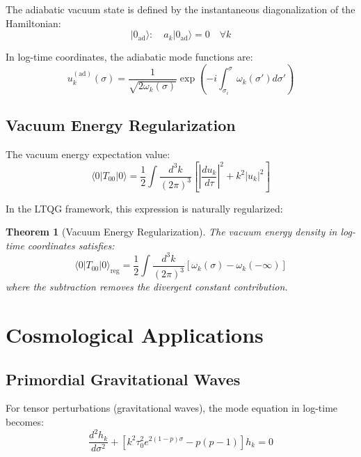 \documentclass[11pt,a4paper]{article}
\newtheorem{theorem}{Theorem}[section]
\begin{document}
The adiabatic vacuum state is defined by the instantaneous diagonalization of the Hamiltonian:
\begin{equation}
|0_{\text{ad}}\rangle : \quad a_k |0_{\text{ad}}\rangle = 0 \quad \forall k
\end{equation}

In log-time coordinates, the adiabatic mode functions are:
\begin{equation}
u_k^{(\text{ad})}(\sigma) = \frac{1}{\sqrt{2\omega_k(\sigma)}} \exp\left(-i \int_{\sigma_i}^{\sigma} \omega_k(\sigma') d\sigma'\right)
\end{equation}

\subsection{Vacuum Energy Regularization}

The vacuum energy expectation value:
\begin{equation}
\langle 0| T_{00} |0\rangle = \frac{1}{2} \int \frac{d^3k}{(2\pi)^3} \left[\left|\frac{du_k}{d\tau}\right|^2 + k^2 |u_k|^2\right]
\end{equation}

In the LTQG framework, this expression is naturally regularized:

\begin{theorem}[Vacuum Energy Regularization]
The vacuum energy density in log-time coordinates satisfies:
\begin{equation}
\langle 0| T_{00} |0\rangle_{\text{reg}} = \frac{1}{2} \int \frac{d^3k}{(2\pi)^3} \left[\omega_k(\sigma) - \omega_k(-\infty)\right]
\end{equation}
where the subtraction removes the divergent constant contribution.
\end{theorem}

\section{Cosmological Applications}

\subsection{Primordial Gravitational Waves}

For tensor perturbations (gravitational waves), the mode equation in log-time becomes:
\begin{equation}
\frac{d^2 h_k}{d\sigma^2} + \left[k^2 \tau_0^2 e^{2(1-p)\sigma} - p(p-1)\right] h_k = 0
\end{equation}
\end{document}
